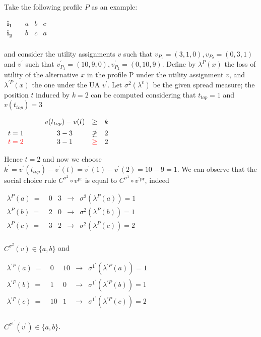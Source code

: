 \documentclass[version=3.21, pagesize, notitlepage, twoside=off, bibliography=totoc, DIV=calc, fontsize=12pt, a4paper]{scrartcl}
\newcommand{\vpr}{v^\text{pr}}
\begin{document}
\begin{example}
	Take the following profile $P$ as an example:
	\begin{center}
		$
		\begin{array}{cccc}
		\mathbf{i_1} \quad &a&b&c\\
		\mathbf{i_2} \quad &b&c&a\\
		\end{array}
		$
	\end{center}

	and consider the utility assignments $v$ such that $v_{P_1}=(3,1,0) , v_{P_2}=(0,3,1)$ and $v^\prime$ such that $v^\prime_{P_1}=(10,9,0) , v^\prime_{P_2}=(0,10,9)$. Define by $\lambda^P(x)$ the loss of utility of the alternative $x$ in the profile P under the utility assignment $v$, and $\lambda^{\prime P}(x)$ the one under the UA $v^\prime$. Let $\sigma^2(\lambda^v)$ be the given spread measure; the position $t$ induced by $k=2$ can be computed considering that $t_{top} = 1$ and $v(t_{top})=3$
	\begin{center}
		$ 
		\begin{array}{cccc}
		& v(t_{top})-v(t) &\geq &k \vspace{1.5mm} \\ 
		t=1 \qquad & 3 - 3 &\ngeq &2 \\
		\color{red}t=2 \qquad & 3 - 1 &\color{red}\geq &2 \\
		\end{array}
		$
	\end{center}
	Hence $t=2$ and now we choose $k^\prime = v^\prime(t_{top})-v^\prime(t)= v^\prime(1)-v^\prime(2)=10-9=1$. We can observe that the social choice rule $C^{\sigma^2} \circ \vpr$ is equal to $C^{\sigma^1} \circ v^{\prime \text{pr}}$, indeed
	\begin{center}
		$
		\begin{array}{ccccc}
		\lambda^P(a) \ = \ &0&3 & \rightarrow & \sigma^2(\lambda^P(a)) = 1\\
		\lambda^P(b) \ = \ &2&0 & \rightarrow & \sigma^2(\lambda^P(b)) = 1\\
		\lambda^P(c) \ = \ &3&2 & \rightarrow & \sigma^2(\lambda^P(c)) = 2\\
		\end{array}
		$
	\end{center}
	$C^{\sigma^2}(v)\in \{a,b\}$ and
	\begin{center}
		$
		\begin{array}{ccccc}
		\lambda^{\prime P}(a) \ = \ &0&10 & \rightarrow & \sigma^{1^\prime}(\lambda^{\prime P}(a)) = 1\\
		\lambda^{\prime P}(b) \ = \ &1&0 & \rightarrow & \sigma^{1^\prime}(\lambda^{\prime P}(b)) = 1\\
		\lambda^{\prime P}(c) \ = \ &10&1 & \rightarrow & \sigma^{1^\prime}(\lambda^{\prime P}(c)) = 2\\
		\end{array}
		$
	\end{center}
	$C^{\sigma^{1^\prime}}(v^\prime)\in \{a,b\}$.
\end{example}
\end{document}

